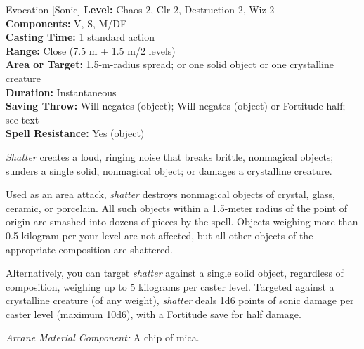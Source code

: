 {Evocation [Sonic]}
{
	\textbf{Level:}
	Chaos 2, Clr 2, Destruction 2, Wiz 2\\
	\textbf{Components:}
	V, S, M/DF\\
	\textbf{Casting Time:}
	1 standard action\\
	\textbf{Range:}
	Close (7.5 m + 1.5 m/2 levels)\\
	\textbf{Area or Target:}
	1.5-m-radius spread; or one solid object or one crystalline creature\\
	\textbf{Duration:}
	Instantaneous\\
	\textbf{Saving Throw:}
	Will negates (object); Will negates (object) or Fortitude half; see text\\
	\textbf{Spell Resistance:}
	Yes (object)\\
}
{
	\emph{Shatter} creates a loud, ringing noise that breaks brittle, nonmagical objects; sunders a single solid, nonmagical object; or damages a crystalline creature.

	Used as an area attack, \emph{shatter} destroys nonmagical objects of crystal, glass, ceramic, or porcelain. All such objects within a 1.5-meter radius of the point of origin are smashed into dozens of pieces by the spell. Objects weighing more than 0.5 kilogram per your level are not affected, but all other objects of the appropriate composition are shattered.

	Alternatively, you can target \emph{shatter} against a single solid object, regardless of composition, weighing up to 5 kilograms per caster level. Targeted against a crystalline creature (of any weight), \emph{shatter} deals 1d6 points of sonic damage per caster level (maximum 10d6), with a Fortitude save for half damage.

	\textit{Arcane Material Component:}
	A chip of mica.

}
